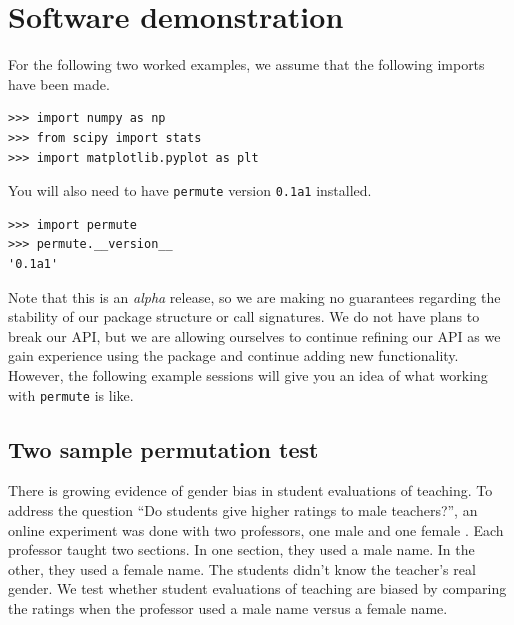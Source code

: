 \chapter{\label{app:ex}Software demonstration}

For the following two worked examples, we assume that the following imports 
have been made.

\begin{verbatim}
>>> import numpy as np
>>> from scipy import stats
>>> import matplotlib.pyplot as plt
\end{verbatim}

You will also need to have \texttt{permute} version \texttt{0.1a1} installed.

\begin{verbatim}
>>> import permute
>>> permute.__version__
'0.1a1'
\end{verbatim}

Note that this is an \emph{alpha} release, so we are making no guarantees
regarding the stability of our package structure or call signatures.  We do not
have plans to break our API, but we are allowing ourselves to continue refining
our API as we gain experience using the package and continue adding new
functionality.  However, the following example sessions will give you an idea
of what working with \texttt{permute} is like.

\section*{Two sample permutation test}

There is growing evidence of gender bias in student evaluations of teaching.
To address the question ``Do students give higher ratings to male teachers?'',
an online experiment was done with two professors, one male and one female
\cite{macnell2014s}.  Each professor taught two sections. In one section, they
used a male name.  In the other, they used a female name. The students didn't
know the teacher's real gender.  We test whether student evaluations of
teaching are biased by comparing the ratings when the professor used a male
name versus a female name.

